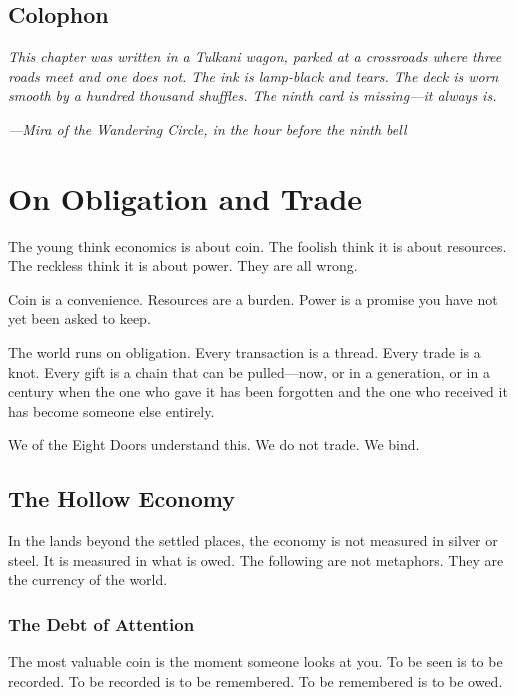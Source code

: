 \documentclass[11pt,letterpaper,twoside]{book}
\begin{document}
\section*{Colophon}

\textit{This chapter was written in a Tulkani wagon, parked at a crossroads where three roads meet and one does not. The ink is lamp-black and tears. The deck is worn smooth by a hundred thousand shuffles. The ninth card is missing---it always is.}

\textit{---Mira of the Wandering Circle, in the hour before the ninth bell}

\newpage

\chapter{On Obligation and Trade}

The young think economics is about coin. The foolish think it is about resources. The reckless think it is about power. They are all wrong.

Coin is a convenience. Resources are a burden. Power is a promise you have not yet been asked to keep.

The world runs on obligation. Every transaction is a thread. Every trade is a knot. Every gift is a chain that can be pulled---now, or in a generation, or in a century when the one who gave it has been forgotten and the one who received it has become someone else entirely.

We of the Eight Doors understand this. We do not trade. We bind.

\section{The Hollow Economy}

In the lands beyond the settled places, the economy is not measured in silver or steel. It is measured in what is owed. The following are not metaphors. They are the currency of the world.

\subsection{The Debt of Attention}

The most valuable coin is the moment someone looks at you. To be seen is to be recorded. To be recorded is to be remembered. To be remembered is to be owed.
\end{document}
